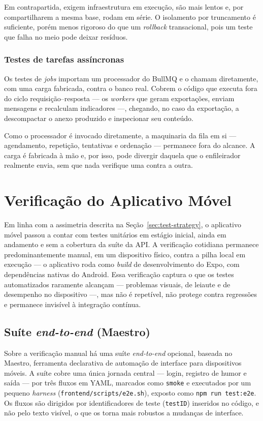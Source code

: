 Em contrapartida, exigem infraestrutura em execução, são mais lentos e, por
compartilharem a mesma base, rodam em série. O isolamento por truncamento é
suficiente, porém menos rigoroso do que um \textit{rollback} transacional, pois
um teste que falha no meio pode deixar resíduos.

\subsubsection{Testes de tarefas assíncronas}

Os testes de \textit{jobs} importam um processador do BullMQ e o chamam
diretamente, com uma carga fabricada, contra o banco real. Cobrem o código que
executa fora do ciclo requisição--resposta --- os \textit{workers} que geram
exportações, enviam mensagens e recalculam indicadores ---, chegando, no caso
da exportação, a descompactar o anexo produzido e inspecionar seu conteúdo.

Como o processador é invocado diretamente, a maquinaria da fila em si ---
agendamento, repetição, tentativas e ordenação --- permanece fora do alcance. A
carga é fabricada à mão e, por isso, pode divergir daquela que o enfileirador
realmente envia, sem que nada verifique uma contra a outra.

\section{Verificação do Aplicativo Móvel}\label{sec:test-mobile}

Em linha com a assimetria descrita na Seção~\ref{sec:test-strategy}, o
aplicativo móvel passou a contar com testes unitários em estágio inicial, ainda
em andamento e sem a cobertura da suíte da API. A verificação cotidiana
permanece predominantemente manual, em um dispositivo físico, contra a pilha
local em execução --- o aplicativo roda como \textit{build} de desenvolvimento
do Expo, com dependências nativas do Android. Essa verificação captura o que os
testes automatizados raramente alcançam --- problemas visuais, de leiaute e de
desempenho no dispositivo ---, mas não é repetível, não protege contra
regressões e permanece invisível à integração contínua.

\subsection{Suíte \textit{end-to-end} (Maestro)}\label{sec:test-mobile-e2e}

Sobre a verificação manual há uma suíte \textit{end-to-end} opcional, baseada
no Maestro, ferramenta declarativa de automação de interface para dispositivos
móveis. A suíte cobre uma única jornada central --- login, registro de humor e
saída --- por três fluxos em YAML, marcados como \texttt{smoke} e executados
por um pequeno \textit{harness} (\texttt{frontend/scripts/e2e.sh}), exposto
como \texttt{npm run test:e2e}. Os fluxos são dirigidos por identificadores de
teste (\texttt{testID}) inseridos no código, e não pelo texto visível, o que os
torna mais robustos a mudanças de interface.

